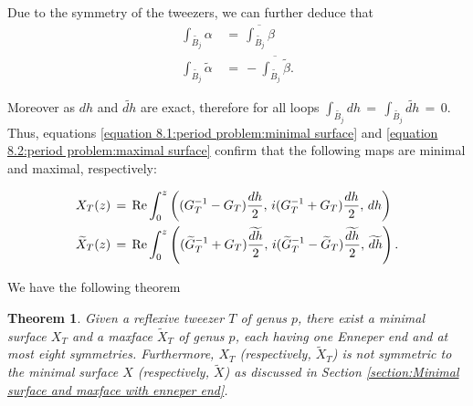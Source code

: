 \documentclass[12pt,epsfig,tikz,multi]{amsart}
\newtheorem{theorem}{Theorem}[section]
\numberwithin{equation}{section}
\begin{document}
Due to the symmetry of the tweezers, we can further deduce that
\begin{align}
    \int_{\widetilde{B_j}}\alpha &\,=\, \overline{\int_{\widetilde{B_j}}\beta} \label{equation 8.1:period problem:minimal surface} \\
    \int_{\widetilde{B_j}}\widetilde\alpha &\,=\, -\overline{\int_{\widetilde{B_j}}\widetilde\beta}. \label{equation 8.2:period problem:maximal surface}
\end{align}

Moreover as  $dh$ and $\widetilde{dh}$ are exact, therefore for all loops  $\int_{\widetilde{B_j}}dh\,=\,\int_{\widetilde{B_{j}}}\widetilde{dh}\,=\,0$. Thus, equations \eqref{equation 
8.1:period problem:minimal surface} and \eqref{equation 8.2:period problem:maximal surface} confirm that the 
following maps are minimal and maximal, respectively:

\begin{align}
    X_T(z\color{black}) &\,=\, \operatorname{Re} \int_0^{z\color{black}} \left( (G_T^{-1} - G_T)  \frac{dh}{2},\,
  i  ( G_T^{-1} + G_T ) \frac{dh}{2},\, dh \right) \label{eqn:minimalsurfaceTweezer} \\
    \widetilde{X}_T(z\color{black}) &\,=\, \operatorname{Re} \int_0^{z\color{black}} \left( (\widetilde{G}_T^{-1} + G_T)
\frac{\widetilde{dh}}{2},\,   i  ( \widetilde{G}_T^{-1} -\widetilde{G}_T ) \frac{\widetilde{dh}}{2},\,  \widetilde{dh} \right).\label{eqn:maximalsurfacetweezer}
\end{align}

We have the following theorem 
\begin{theorem}\label{thm:surfaceFromTweezer}
    Given a reflexive tweezer $T$ of genus $p$, there exist a minimal surface $X_T$ and a maxface $\widetilde{X}_T$ of genus $p$, each having one Enneper end and at most eight symmetries. Furthermore, $X_T$ (respectively, $\widetilde{X}_T$) is not symmetric to the minimal surface $X$ (respectively, $\widetilde{X}$) as discussed in Section \ref{section:Minimal surface and maxface with enneper end}.
\end{theorem}
\end{document}
